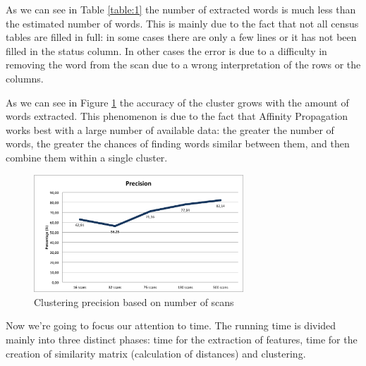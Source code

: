 As we can see in Table \ref{table:1} the number of extracted words is much less than the estimated number of words. This is mainly due to the fact that not all census tables are filled in full: in some cases there are only a few lines or it has not been filled in the status column. In other cases the error is due to a difficulty in removing the word from the scan due to a wrong interpretation of the rows or the columns.

As we can see in Figure \ref{fig:precision} the accuracy of the cluster grows with the amount of words extracted. This phenomenon is due to the fact that Affinity Propagation works best with a large number of available data: the greater the number of words, the greater the chances of finding words similar between them, and then combine them within a single cluster.

\begin{figure}[!htbp]
\centering
\includegraphics[width=0.7\textwidth]{images/precisione.png}
\caption{Clustering precision based on number of scans}
\label{fig:precision}
\end{figure}

Now we're going to focus our attention to time. The running time is divided mainly into three distinct phases: time for the extraction of features, time for the creation of similarity matrix (calculation of distances) and clustering.

